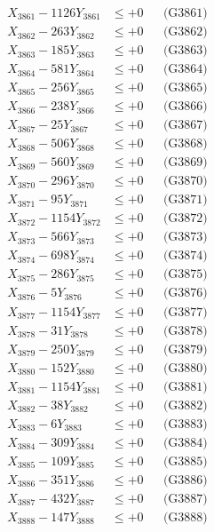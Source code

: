 \documentclass[a4paper,10pt]{article}
\begin{document}
{\begin{align}
\allowbreak
X_{3861} - 1126Y_{3861} &\leq +0 && \text{(G3861)} \\
X_{3862} - 263Y_{3862} &\leq +0 && \text{(G3862)} \\
X_{3863} - 185Y_{3863} &\leq +0 && \text{(G3863)} \\
X_{3864} - 581Y_{3864} &\leq +0 && \text{(G3864)} \\
X_{3865} - 256Y_{3865} &\leq +0 && \text{(G3865)} \\
X_{3866} - 238Y_{3866} &\leq +0 && \text{(G3866)} \\
X_{3867} - 25Y_{3867} &\leq +0 && \text{(G3867)} \\
X_{3868} - 506Y_{3868} &\leq +0 && \text{(G3868)} \\
X_{3869} - 560Y_{3869} &\leq +0 && \text{(G3869)} \\
X_{3870} - 296Y_{3870} &\leq +0 && \text{(G3870)} \\
\allowbreak
X_{3871} - 95Y_{3871} &\leq +0 && \text{(G3871)} \\
X_{3872} - 1154Y_{3872} &\leq +0 && \text{(G3872)} \\
X_{3873} - 566Y_{3873} &\leq +0 && \text{(G3873)} \\
X_{3874} - 698Y_{3874} &\leq +0 && \text{(G3874)} \\
X_{3875} - 286Y_{3875} &\leq +0 && \text{(G3875)} \\
X_{3876} - 5Y_{3876} &\leq +0 && \text{(G3876)} \\
X_{3877} - 1154Y_{3877} &\leq +0 && \text{(G3877)} \\
X_{3878} - 31Y_{3878} &\leq +0 && \text{(G3878)} \\
X_{3879} - 250Y_{3879} &\leq +0 && \text{(G3879)} \\
X_{3880} - 152Y_{3880} &\leq +0 && \text{(G3880)} \\
\allowbreak
X_{3881} - 1154Y_{3881} &\leq +0 && \text{(G3881)} \\
X_{3882} - 38Y_{3882} &\leq +0 && \text{(G3882)} \\
X_{3883} - 6Y_{3883} &\leq +0 && \text{(G3883)} \\
X_{3884} - 309Y_{3884} &\leq +0 && \text{(G3884)} \\
X_{3885} - 109Y_{3885} &\leq +0 && \text{(G3885)} \\
X_{3886} - 351Y_{3886} &\leq +0 && \text{(G3886)} \\
X_{3887} - 432Y_{3887} &\leq +0 && \text{(G3887)} \\
X_{3888} - 147Y_{3888} &\leq +0 && \text{(G3888)} \\

\end{align}}
\end{document}
